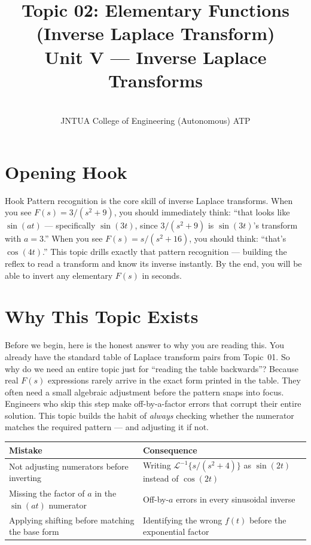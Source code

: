 \documentclass[12pt,a4paper]{article}
\title{Topic 02: Elementary Functions (Inverse Laplace Transform) \\
       \large Unit V --- Inverse Laplace Transforms}
\author{\\
        JNTUA College of Engineering (Autonomous) ATP}
\date{}
\begin{document}
\maketitle
\tableofcontents
\newpage

\section{Opening Hook}

\begin{curiositybox}{Hook}
Pattern recognition is the core skill of inverse Laplace transforms.
When you see $F(s) = 3/(s^2+9)$, you should immediately think: ``that looks like $\sin(at)$
--- specifically $\sin(3t)$, since $3/(s^2+9)$ is $\sin(3t)$'s transform with $a=3$.''
When you see $F(s) = s/(s^2+16)$, you should think: ``that's $\cos(4t)$.''
This topic drills exactly that pattern recognition --- building the reflex to read a transform
and know its inverse instantly. By the end, you will be able to invert any elementary $F(s)$
in seconds.
\end{curiositybox}

\section{Why This Topic Exists}

Before we begin, here is the honest answer to why you are reading this. You already have
the standard table of Laplace transform pairs from Topic~01. So why do we need an entire
topic just for ``reading the table backwards''? Because real $F(s)$ expressions rarely arrive
in the exact form printed in the table. They often need a small algebraic adjustment before
the pattern snaps into focus. Engineers who skip this step make off-by-a-factor errors
that corrupt their entire solution. This topic builds the habit of \emph{always} checking
whether the numerator matches the required pattern --- and adjusting it if not.

\medskip
\begin{center}
\begin{tabular}{@{}lp{7.5cm}@{}}
\toprule
\textbf{Mistake} & \textbf{Consequence} \\
\midrule
Not adjusting numerators before inverting &
  Writing $\mathcal{L}^{-1}\{s/(s^2+4)\}$ as $\sin(2t)$ instead of $\cos(2t)$ \\
Missing the factor of $a$ in the $\sin(at)$ numerator &
  Off-by-$a$ errors in every sinusoidal inverse \\
Applying shifting before matching the base form &
  Identifying the wrong $f(t)$ before the exponential factor \\
\bottomrule
\end{tabular}
\end{center}
\end{document}
